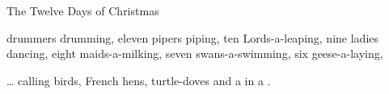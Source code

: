\begin{SBSong}{The Twelve Days of Christmas}
\begin{SBVerse}
	 drummers drumming, 
	eleven pipers piping, 
	ten Lords-a-leaping, 
	nine ladies dancing, 
	eight maids-a-milking, 
	seven swans-a-swimming, 
	six geese-a-laying,
	
	  \ldots 
	 calling birds, 
	 French hens, 
	 turtle-doves 
	and a  in a  .       
  \end{SBVerse}
\end{SBSong}

